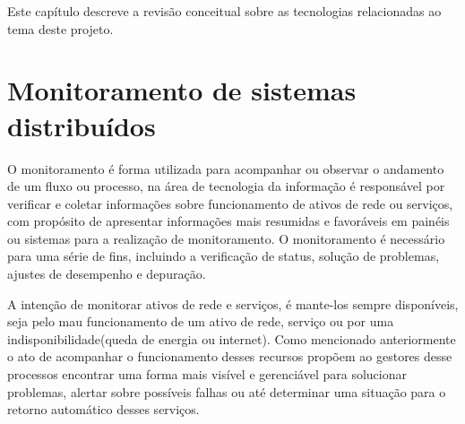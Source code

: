 \label{fundamentacao_teorica}


\newcommand{\texCommand}[1]{\texttt{\textbackslash{#1}}}%

\newcommand{\exemplo}[1]{%
\vspace{\baselineskip}%
\noindent\fbox{\begin{minipage}{\textwidth}#1\end{minipage}}%
\\\vspace{\baselineskip}}%

\newcommand{\exemploVerbatim}[1]{%
\vspace{\baselineskip}%
\noindent\fbox{\begin{minipage}{\textwidth}%
#1\end{minipage}}%
\\\vspace{\baselineskip}}%


Este capítulo descreve a revisão conceitual sobre as tecnologias relacionadas ao tema deste projeto. 


\section{Monitoramento de sistemas distribuídos}%

O monitoramento é forma utilizada para acompanhar ou observar o andamento de um fluxo ou processo, na área de tecnologia da informação é responsável por verificar e coletar informações sobre funcionamento de ativos de rede ou serviços, com propósito de apresentar informações mais resumidas e favoráveis em painéis ou sistemas para a realização de monitoramento\cite{de2014indicadores}. O monitoramento é necessário para uma série de fins, incluindo a verificação de status, solução de problemas, ajustes de desempenho e depuração\cite{hollingsworth2003instrumentation}. 

A intenção de monitorar ativos de rede e serviços, é mante-los sempre disponíveis, seja pelo mau funcionamento de um ativo de rede, serviço ou por uma indisponibilidade(queda de energia ou internet). Como mencionado anteriormente o ato de acompanhar o funcionamento desses recursos propõem ao gestores desse processos encontrar uma forma mais visível e gerenciável para solucionar problemas, alertar sobre possíveis falhas ou até determinar uma situação para o retorno automático desses serviços. 

